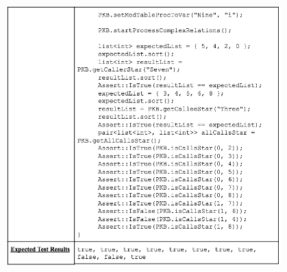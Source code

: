 \documentclass[12pt]{article}
\begin{document}
{{{{{{{{{{\begin{table}[!htbp]
  \includegraphics[width=0.8\textwidth]{UnitTest3.png}
\end{table}
}}}}}}}}}}
\end{document}
